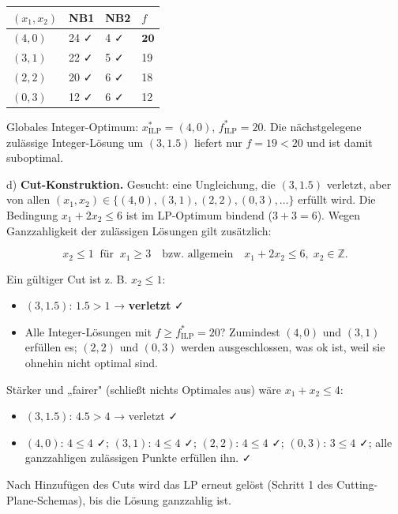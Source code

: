 \documentclass[11pt, a4paper]{article}
\begin{document}
{\small
\begin{tabularx}{\linewidth}{XXXX}
\hline
\rowcolor{tableheadbg}
{\color{white}\textbf{$(x_1, x_2)$}} & {\color{white}\textbf{NB1}} & {\color{white}\textbf{NB2}} & {\color{white}\textbf{$f$}} \\[2pt]
\hline
\endhead
\hline
\endfoot
$(4,0)$ & 24 ✓ & 4 ✓ & $\mathbf{20}$ \\
$(3,1)$ & 22 ✓ & 5 ✓ & 19 \\
$(2,2)$ & 20 ✓ & 6 ✓ & 18 \\
$(0,3)$ & 12 ✓ & 6 ✓ & 12 \\
\end{tabularx}
}


Globales Integer-Optimum: $x^*_{\text{ILP}} = (4, 0)$, $f^*_{\text{ILP}} = 20$. Die nächstgelegene zulässige Integer-Lösung um $(3,1.5)$ liefert nur $f = 19 < 20$ und ist damit suboptimal.


d) \textbf{Cut-Konstruktion.} Gesucht: eine Ungleichung, die $(3, 1.5)$ verletzt, aber von allen $(x_1, x_2)\in\{(4,0),(3,1),(2,2),(0,3),\dots\}$ erfüllt wird. Die Bedingung $x_1 + 2x_2 \leq 6$ ist im LP-Optimum bindend ($3 + 3 = 6$). Wegen Ganzzahligkeit der zulässigen Lösungen gilt zusätzlich:

\[
x_2 \leq 1 \;\;\text{für}\;\; x_1 \geq 3 \quad\text{bzw. allgemein}\quad x_1 + 2x_2 \leq 6,\;x_2\in\mathbb{Z}.
\]


Ein gültiger Cut ist z. B. $\boxed{x_2 \leq 1}$:

\begin{itemize}
  \item $(3, 1.5)$: $1.5 > 1$ → \textbf{verletzt} ✓
  \item Alle Integer-Lösungen mit $f \geq f^*_{\text{ILP}}=20$? Zumindest $(4,0)$ und $(3,1)$ erfüllen es; $(2,2)$ und $(0,3)$ werden ausgeschlossen, was ok ist, weil sie ohnehin nicht optimal sind.
\end{itemize}

Stärker und „fairer" (schließt nichts Optimales aus) wäre $x_1 + x_2 \leq 4$:

\begin{itemize}
  \item $(3,1.5)$: $4.5 > 4$ → verletzt ✓
  \item $(4,0)$: $4 \leq 4$ ✓; $(3,1)$: $4\leq 4$ ✓; $(2,2)$: $4\leq 4$ ✓; $(0,3)$: $3\leq 4$ ✓; alle ganzzahligen zulässigen Punkte erfüllen ihn. ✓
\end{itemize}

Nach Hinzufügen des Cuts wird das LP erneut gelöst (Schritt 1 des Cutting-Plane-Schemas), bis die Lösung ganzzahlig ist.
\end{document}
